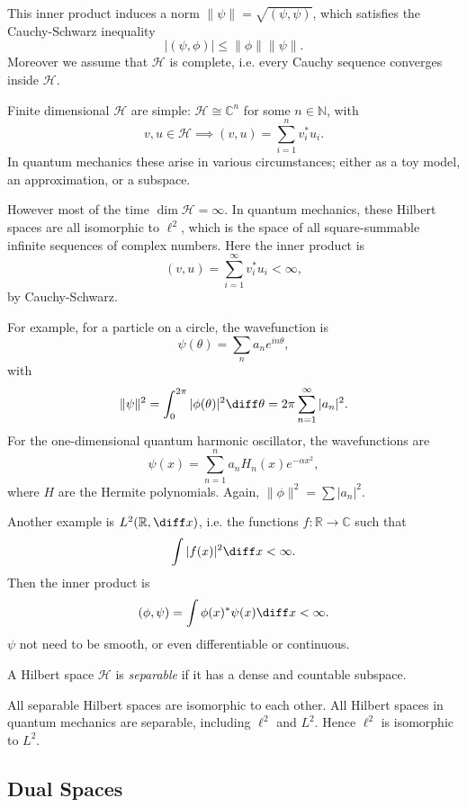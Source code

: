 \documentclass[12pt]{article}
\begin{document}
This inner product induces a norm $\|\psi\| = \sqrt{(\psi, \psi)}$, which satisfies the Cauchy-Schwarz inequality
\[
|(\psi, \phi)| \le \|\phi\|\|\psi\|.
\]
Moreover we assume that $\mathcal{H}$ is complete, i.e. every Cauchy sequence converges inside $\mathcal{H}$.

\begin{exbox}
	Finite dimensional $\mathcal{H}$ are simple: $\mathcal{H} \cong \mathbb{C}^{n}$ for some $n \in \mathbb{N}$, with
	\[
	v, u \in \mathcal{H} \implies(v, u) = \sum_{i=1}^{n} v_i^{\ast} u_i.
	\]
	In quantum mechanics these arise in various circumstances; either as a toy model, an approximation, or a subspace.

	However most of the time $\dim \mathcal{H} = \infty$. In quantum mechanics, these Hilbert spaces are all isomorphic to $\ell^2$, which is the space of all square-summable infinite sequences of complex numbers. Here the inner product is
	\[
		(v, u) = \sum_{i=1}^{\infty} v_i^{\ast} u_i < \infty,
	\]
	by Cauchy-Schwarz.

	For example, for a particle on a circle, the wavefunction is
	\[
	\psi(\theta) = \sum_n a_n e^{i n \theta},
	\]
	with
	\[
	\|\psi\|^2 = \int_0^{2\pi} |\phi(\theta)|^2\diff\theta = 2\pi\sum_{n=1}^{\infty}|a_n|^2.
	\]
	For the one-dimensional quantum harmonic oscillator, the wavefunctions are
	\[
	\psi(x)=\sum_{n=1}^{n} a_n H_n(x) e^{-\alpha x^2},
	\]
	where $H$ are the Hermite polynomials. Again, $\|\phi\|^2=\sum |a_n|^2$.

	Another example is $L^2(\mathbb{R},\diff x)$, i.e. the functions $f : \mathbb{R} \to \mathbb{C}$ such that
	\[
		\int |f(x)|^2\diff x < \infty.
	\]
	Then the inner product is
	\[
		(\phi,\psi) = \int \phi(x)^{\ast}\psi(x) \diff x < \infty.
	\]
	$\psi$ not need to be smooth, or even differentiable or continuous.
\end{exbox}

A Hilbert space $\mathcal{H}$ is \emph{separable} if it has a dense and countable subspace.

All separable Hilbert spaces are isomorphic to each other. All Hilbert spaces in quantum mechanics are separable, including $\ell^2$ and $L^2$. Hence $\ell^2$ is isomorphic to $L^2$.

\subsection{Dual Spaces}
\label{sub:dual_spaces}
\end{document}
